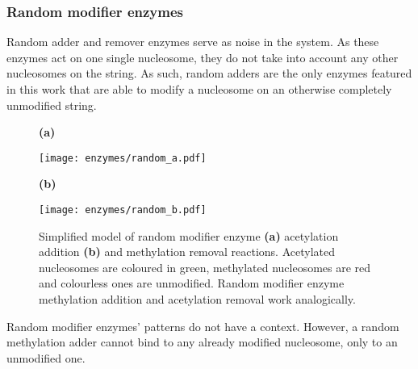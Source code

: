             \subsubsection{Random modifier enzymes}
                Random adder and remover enzymes serve as noise in the system. As these enzymes act on one single nucleosome, they do not take into account any other nucleosomes on the string. As such, random adders are the only enzymes featured in this work that are able to modify a nucleosome on an otherwise completely unmodified string.
                \begin{figure}[htpb!]
                    \centering
                    \begin{minipage}[t][5cm]{\textwidth}
                        \begin{minipage}{0.15\textwidth}
                            \caption*{\small \textbf{(a)}}
                        \end{minipage}
                        \begin{minipage}{0.8\textwidth}
                            \texttt{[image: enzymes/random\_a.pdf]}
                        \end{minipage}
                        \vfill
                        \begin{minipage}{0.15\textwidth}
                            \caption*{\small \textbf{(b)}}
                        \end{minipage}
                        \begin{minipage}{0.8\textwidth}
                            \texttt{[image: enzymes/random\_b.pdf]}
                        \end{minipage}
                    \end{minipage}
                    \caption{Simplified model of random modifier enzyme \textbf{(a)} acetylation addition \textbf{(b)} and methylation removal reactions. Acetylated nucleosomes are coloured in green, methylated nucleosomes are red and colourless ones are unmodified. Random modifier enzyme methylation addition and acetylation removal work analogically.}
                    \label{img:randomEnzymes}
                \end{figure}

                Random modifier enzymes' patterns do not have a context. However, a random methylation adder cannot bind to any already modified nucleosome, only to an unmodified one.

